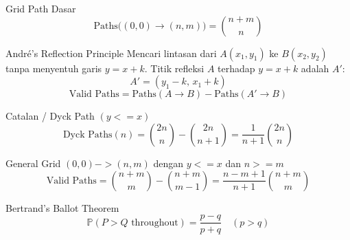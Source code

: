 Grid Path Dasar
$$\text{Paths}\big((0, 0) \to (n, m)\big) = \binom{n + m}{n}$$

André's Reflection Principle \newline
Mencari lintasan dari $A(x_1, y_1)$ ke $B(x_2, y_2)$ tanpa menyentuh garis $y = x + k$. \newline
Titik refleksi $A$ terhadap $y = x +k$ adalah $A'$:
$$A' = (y_1 - k, \, x_1 + k)$$
$$\text{Valid Paths} = \text{Paths}(A \to B) - \text{Paths}(A' \to B)$$

Catalan / Dyck Path $(y <= x)$
$$\text{Dyck Paths}(n) = \binom{2n}{n} - \binom{2n}{n + 1} = \frac{1}{n + 1}\binom{2n}{n}$$

General Grid $(0, 0) -> (n, m)$ dengan $y <= x$ dan $n >= m$
$$\text{Valid Paths} = \binom{n + m}{m} - \binom{n + m}{m - 1} = \frac{n - m + 1}{n + 1}\binom{n + m}{m}$$

Bertrand's Ballot Theorem
$$\mathbb{P}(P > Q \text{ throughout}) = \frac{p - q}{p + q} \quad (p > q)$$